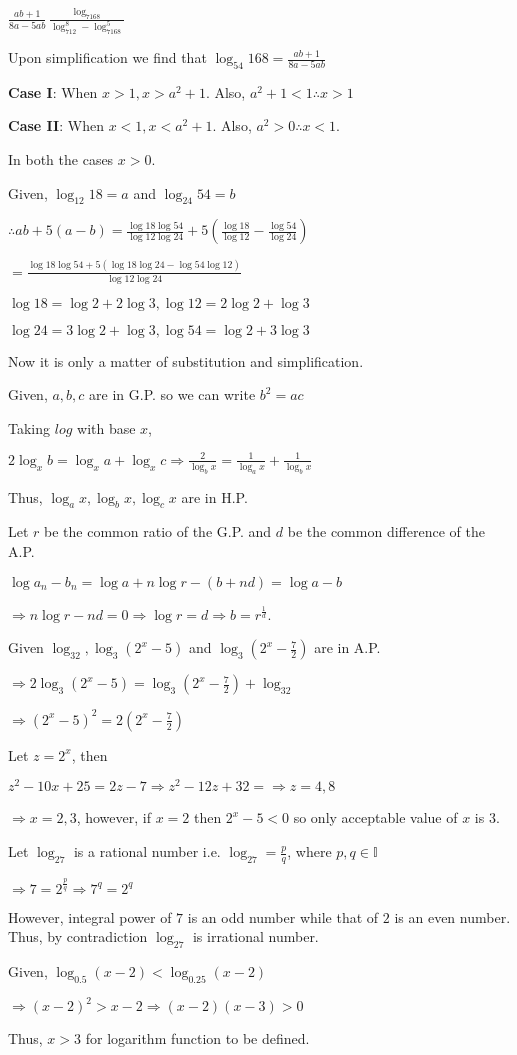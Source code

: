   $\frac{ab + 1}{8a - 5ab} \frac{\log_7168}{\log_712^8 - \log_7168^5}$

  Upon simplification we find that $\log_{54}168 = \frac{ab + 1}{8a - 5ab}$
\item {\bf Case I}: When $x > 1, x > a^2 + 1$. Also, $a^2 + 1 < 1 \therefore x > 1$

  {\bf Case II}: When $x < 1, x < a^2 + 1$. Also, $a^2 > 0 \therefore x < 1$.

  In both the cases $x > 0$.
\item Given, $\log_{12}18 = a$ and $\log_{24}54 = b$

  $\therefore ab + 5(a - b) = \frac{\log 18\log 54}{\log 12\log 24} + 5\left(\frac{\log 18}{\log 12} - \frac{\log 54}{\log 24}\right)$

  $= \frac{\log 18\log 54 + 5(\log 18\log 24 - \log 54\log 12)}{\log 12\log 24}$

  $\log 18 = \log 2 + 2\log 3, \log 12 = 2\log 2 + \log 3$

  $\log 24 = 3\log 2 + \log 3, \log 54 = \log 2 + 3\log 3$

  Now it is only a matter of substitution and simplification.
\item Given, $a, b, c$ are in G.P. so we can write $b^2 = ac$

  Taking $log$ with base $x$,

  $2\log_xb = \log_xa + \log_xc \Rightarrow \frac{2}{\log_bx} = \frac{1}{\log_ax} + \frac{1}{\log_bx}$

  Thus, $\log_ax, \log_bx, \log_cx$ are in H.P.
\item Let $r$ be the common ratio of the G.P. and $d$ be the common difference of the A.P.

  $\log a_n - b_n = \log a + n\log r - (b + nd) = \log a - b$

  $\Rightarrow n\log r - nd = 0 \Rightarrow \log r = d \Rightarrow b = r^{\tfrac{1}{d}}$.
\item Given $\log_32, \log_3(2^x - 5)$ and $\log_3\left(2^x - \frac{7}{2}\right)$ are in A.P.

  $\Rightarrow 2\log_3(2^x - 5) = \log_3\left(2^x - \frac{7}{2}\right) + \log_32$

  $\Rightarrow (2^x - 5)^2 = 2\left(2^x - \frac{7}{2}\right)$

  Let $z = 2^x$, then

  $z^2 - 10x  + 25 = 2z - 7 \Rightarrow z^2 - 12z + 32 = \Rightarrow z = 4, 8$

  $\Rightarrow x = 2, 3$, however, if $x = 2$ then $2^x - 5 < 0$ so only acceptable value of $x$ is $3$.
\item Let $\log_27$ is a rational number i.e. $\log_27 = \frac{p}{q}$, where $p, q\in\mathbb{I}$

  $\Rightarrow 7 = 2^{\tfrac{p}{q}} \Rightarrow 7^q = 2^q$

  However, integral power of $7$ is an odd number while that of $2$ is an even number. Thus, by contradiction
  $\log_27$ is irrational number.
\item Given, $\log_{0.5}(x - 2) < \log_{0.25}(x - 2)$

  $\Rightarrow (x- 2)^2 > x - 2 \Rightarrow (x - 2)(x - 3) > 0$

  Thus, $x > 3$ for logarithm function to be defined.
\stopitemize
